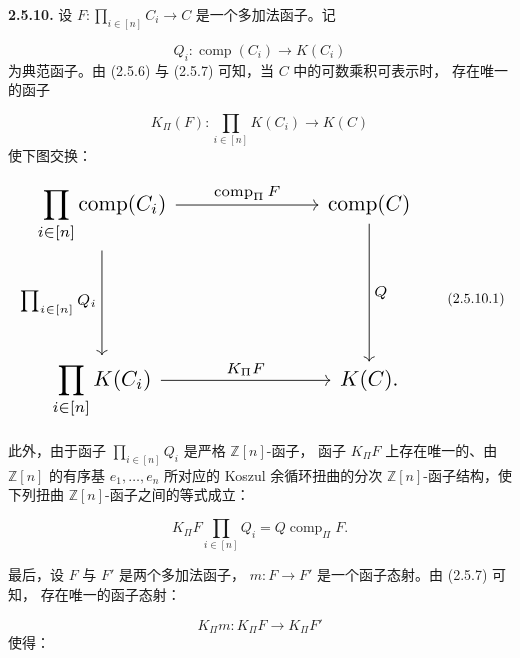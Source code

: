 \clearpage
{}%
\noindent\textbf{2.5.10.}\quad
{}
设
$F\colon\prod_{i\in[n]}C_i\longrightarrow C$ 是一个多加法函子。记

\begin{equation*}
  Q_i\colon\operatorname{comp}(C_i)\longrightarrow K(C_i)
\end{equation*}
为典范函子。由 (2.5.6) 与 (2.5.7) 可知，当 $C$ 中的可数乘积可表示时，
存在唯一的函子

\begin{equation*}
  K_{\Pi}(F)\colon
  \prod_{i\in[n]}K(C_i)\longrightarrow K(C)
\end{equation*}
使下图交换：

\begin{equation}
  \resizebox{0.84\textwidth}{!}{%
    $\begin{tikzcd}[ampersand replacement=\&,column sep=6.8em,row sep=5.0em]
      \displaystyle\prod_{i\in[n]}\operatorname{comp}(C_i)
        \arrow[r,"{\operatorname{comp}_{\Pi}F}"]
        \arrow[d,"{\prod_{i\in[n]}Q_i}"']
        \& \operatorname{comp}(C)
          \arrow[d,"Q"] \\
      \displaystyle\prod_{i\in[n]}K(C_i)
        \arrow[r,"{K_{\Pi}F}"]
        \& K(C)\mathpunct{.}
    \end{tikzcd}$%
  }
  \tag{2.5.10.1}
\end{equation}

此外，由于函子 $\prod_{i\in[n]}Q_i$ 是严格 $\mathbb Z[n]$-函子，
函子 $K_{\Pi}F$ 上存在唯一的、由 $\mathbb Z[n]$ 的有序基
$e_1,\ldots,e_n$ 所对应的 Koszul 余循环扭曲的分次
$\mathbb Z[n]$-函子结构，使下列扭曲 $\mathbb Z[n]$-函子之间的等式成立：

\begin{equation}
  K_{\Pi}F\prod_{i\in[n]}Q_i
  =Q\operatorname{comp}_{\Pi}F.
  \tag{2.5.10.2}
\end{equation}

最后，设 $F$ 与 $F'$ 是两个多加法函子，
$m\colon F\longrightarrow F'$ 是一个函子态射。由 (2.5.7) 可知，
存在唯一的函子态射：

\begin{equation}
  K_{\Pi}m\colon K_{\Pi}F\longrightarrow K_{\Pi}F'
  \tag{2.5.10.3}
\end{equation}
使得：

